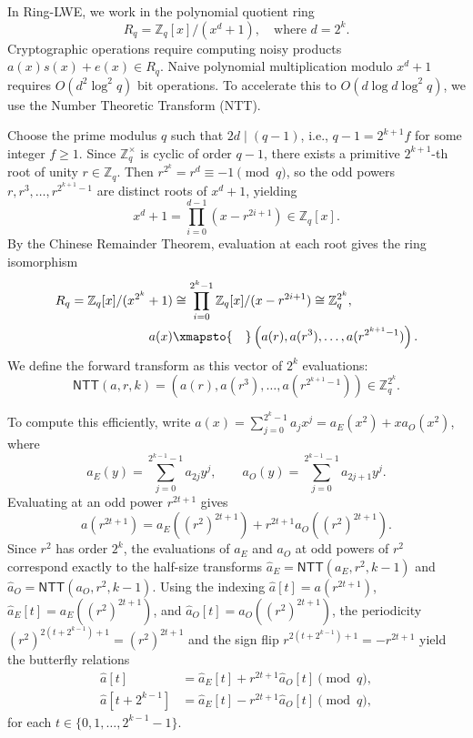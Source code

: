 
In Ring-LWE, we work in the polynomial quotient ring
\[
    R_q = \mathbb{Z}_q[x] / (x^d + 1), \quad \text{where } d = 2^k.
\]
Cryptographic operations require computing noisy products \(a(x)s(x) + e(x) \in R_q\).
Naive polynomial multiplication modulo \(x^d + 1\) requires \(O(d^2 \log^2 q)\) bit operations.
To accelerate this to \(O(d \log d \log^2 q)\), we use the Number Theoretic Transform (NTT).

Choose the prime modulus \(q\) such that \(2d \mid (q - 1)\), i.e., \(q - 1 = 2^{k+1} f\) for some integer \(f \ge 1\).
Since \(\mathbb{Z}_q^\times\) is cyclic of order \(q - 1\), there exists a primitive \(2^{k+1}\)-th root of unity \(r \in \mathbb{Z}_q\).
Then \(r^{2^k} = r^d \equiv -1 \pmod q\), so the odd powers \(r, r^3, \dots, r^{2^{k+1}-1}\) are distinct roots of \(x^d + 1\), yielding
\[
    x^d + 1 = \prod_{i=0}^{d-1} \left( x - r^{2i+1} \right) \in \mathbb{Z}_q[x].
\]
By the Chinese Remainder Theorem, evaluation at each root gives the ring isomorphism
\begin{align*}
    R_q = \mathbb{Z}_q[x] / (x^{2^k} + 1)
    &\cong \prod_{i=0}^{2^k-1} \mathbb{Z}_q[x] / (x - r^{2i+1}) \cong \mathbb{Z}_q^{2^k}, \\
    a(x) &\xmapsto{\quad} \left( a(r), a(r^3), \dots, a(r^{2^{k+1}-1}) \right).
\end{align*}
We define the forward transform as this vector of \(2^k\) evaluations:
\[
    \mathsf{NTT}(a, r, k) = \left( a(r), a(r^3), \dots, a(r^{2^{k+1}-1}) \right) \in \mathbb{Z}_q^{2^k}.
\]

To compute this efficiently, write \(a(x) = \sum_{j=0}^{2^k - 1} a_j x^j = a_E(x^2) + x a_O(x^2)\), where
\[
    a_E(y) = \sum_{j=0}^{2^{k-1} - 1} a_{2j} y^j, \qquad a_O(y) = \sum_{j=0}^{2^{k-1} - 1} a_{2j+1} y^j.
\]
Evaluating at an odd power \(r^{2t+1}\) gives
\[
    a(r^{2t+1}) = a_E\left( (r^2)^{2t+1} \right) + r^{2t+1} a_O\left( (r^2)^{2t+1} \right).
\]
Since \(r^2\) has order \(2^k\), the evaluations of \(a_E\) and \(a_O\) at odd powers of \(r^2\) correspond exactly to the half-size transforms \(\hat{a}_E = \mathsf{NTT}(a_E, r^2, k-1)\) and \(\hat{a}_O = \mathsf{NTT}(a_O, r^2, k-1)\).
Using the indexing \(\hat{a}[t] = a(r^{2t+1})\), \(\hat{a}_E[t] = a_E((r^2)^{2t+1})\), and \(\hat{a}_O[t] = a_O((r^2)^{2t+1})\), the periodicity \((r^2)^{2(t + 2^{k-1}) + 1} = (r^2)^{2t+1}\) and the sign flip \(r^{2(t + 2^{k-1}) + 1} = -r^{2t+1}\) yield the butterfly relations
\begin{align*}
    \hat{a}[t]           &= \hat{a}_E[t] + r^{2t+1} \hat{a}_O[t] \pmod q, \\
    \hat{a}[t + 2^{k-1}] &= \hat{a}_E[t] - r^{2t+1} \hat{a}_O[t] \pmod q,
\end{align*}
for each \(t \in \{0, 1, \dots, 2^{k-1} - 1\}\).

